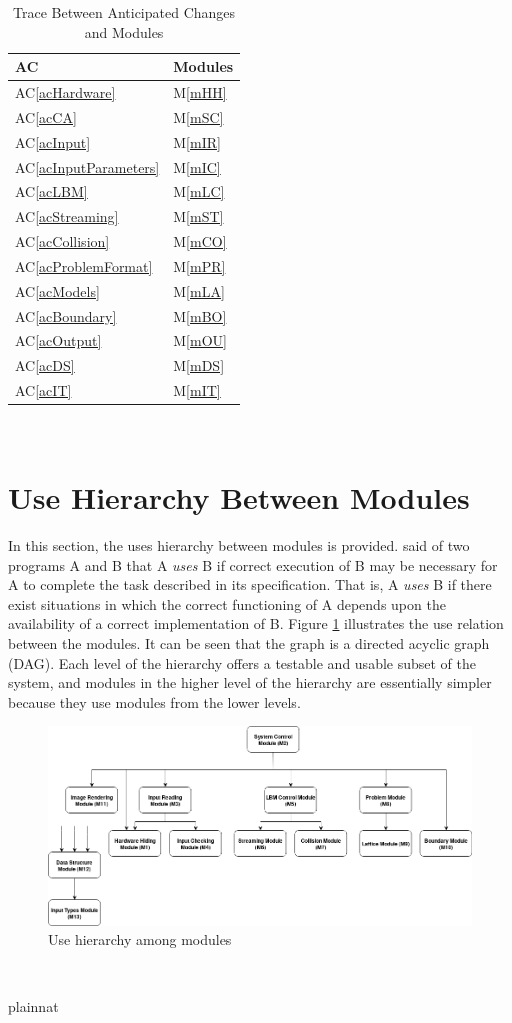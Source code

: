 \documentclass[12pt, titlepage]{article}
\newcommand{\acref}[1]{AC\ref{#1}}
\newcommand{\mref}[1]{M\ref{#1}}
\begin{document}
\begin{table}[H]
\centering
\begin{tabular}{p{} p{}}
\toprule
\textbf{AC} & \textbf{Modules}\\
\midrule
\acref{acHardware} & \mref{mHH}\\
\acref{acCA} & \mref{mSC}\\
\acref{acInput} & \mref{mIR}\\
\acref{acInputParameters} & \mref{mIC}\\
\acref{acLBM} & \mref{mLC}\\
\acref{acStreaming} & \mref{mST}\\
\acref{acCollision} & \mref{mCO}\\
\acref{acProblemFormat} & \mref{mPR}\\
\acref{acModels} & \mref{mLA}\\
\acref{acBoundary} & \mref{mBO}\\
\acref{acOutput} & \mref{mOU}\\
\acref{acDS} & \mref{mDS}\\
\acref{acIT} & \mref{mIT}\\
\bottomrule
\end{tabular}
\caption{Trace Between Anticipated Changes and Modules}
\label{TblACT}
\end{table}

~\newpage

\section{Use Hierarchy Between Modules} \label{SecUse}

In this section, the uses hierarchy between modules is
provided. \citet{Parnas1978} said of two programs A and B that A {\em uses} B if
correct execution of B may be necessary for A to complete the task described in
its specification. That is, A {\em uses} B if there exist situations in which
the correct functioning of A depends upon the availability of a correct
implementation of B.  Figure \ref{FigUH} illustrates the use relation between
the modules. It can be seen that the graph is a directed acyclic graph
(DAG). Each level of the hierarchy offers a testable and usable subset of the
system, and modules in the higher level of the hierarchy are essentially simpler
because they use modules from the lower levels.

\begin{figure}[H]
\centering
\includegraphics[width=1.0\textwidth]{DAG_CAS741}
\caption{Use hierarchy among modules}
\label{FigUH}
\end{figure}

~\newpage

 {plainnat}

\end{document}
